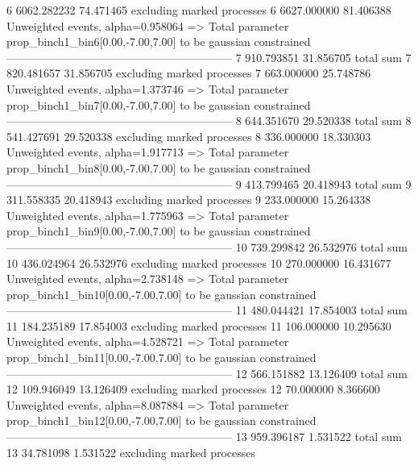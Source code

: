 6          6062.282232     74.471465       excluding marked processes    
6          6627.000000     81.406388       Unweighted events, alpha=0.958064
  => Total parameter prop_binch1_bin6[0.00,-7.00,7.00] to be gaussian constrained
------------------------------------------------------------
7          910.793851      31.856705       total sum                     
7          820.481657      31.856705       excluding marked processes    
7          663.000000      25.748786       Unweighted events, alpha=1.373746
  => Total parameter prop_binch1_bin7[0.00,-7.00,7.00] to be gaussian constrained
------------------------------------------------------------
8          644.351670      29.520338       total sum                     
8          541.427691      29.520338       excluding marked processes    
8          336.000000      18.330303       Unweighted events, alpha=1.917713
  => Total parameter prop_binch1_bin8[0.00,-7.00,7.00] to be gaussian constrained
------------------------------------------------------------
9          413.799465      20.418943       total sum                     
9          311.558335      20.418943       excluding marked processes    
9          233.000000      15.264338       Unweighted events, alpha=1.775963
  => Total parameter prop_binch1_bin9[0.00,-7.00,7.00] to be gaussian constrained
------------------------------------------------------------
10         739.299842      26.532976       total sum                     
10         436.024964      26.532976       excluding marked processes    
10         270.000000      16.431677       Unweighted events, alpha=2.738148
  => Total parameter prop_binch1_bin10[0.00,-7.00,7.00] to be gaussian constrained
------------------------------------------------------------
11         480.044421      17.854003       total sum                     
11         184.235189      17.854003       excluding marked processes    
11         106.000000      10.295630       Unweighted events, alpha=4.528721
  => Total parameter prop_binch1_bin11[0.00,-7.00,7.00] to be gaussian constrained
------------------------------------------------------------
12         566.151882      13.126409       total sum                     
12         109.946049      13.126409       excluding marked processes    
12         70.000000       8.366600        Unweighted events, alpha=8.087884
  => Total parameter prop_binch1_bin12[0.00,-7.00,7.00] to be gaussian constrained
------------------------------------------------------------
13         959.396187      1.531522        total sum                     
13         34.781098       1.531522        excluding marked processes    
